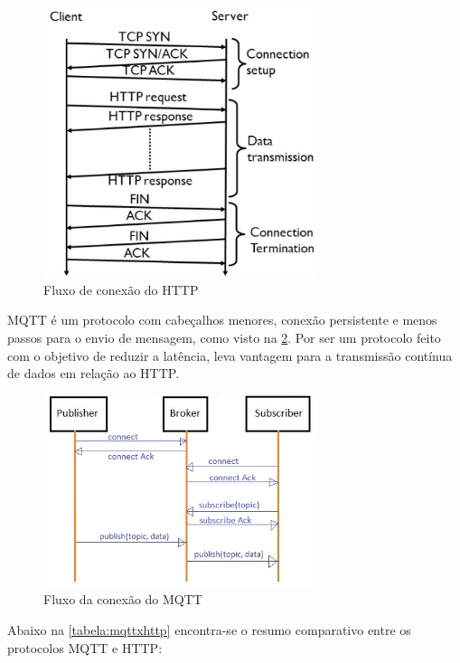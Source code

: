 \begin{figure}[h]
\centering
\includegraphics[width=8cm]{./02_Capitulos/02_Cap3/figures/http-flow}
\caption{Fluxo de conexão do HTTP}
\label{fig:3.2.0/http-flow}
\end{figure}

MQTT é um protocolo com cabeçalhos menores, conexão persistente e menos passos para o envio de mensagem, como visto na \ref{fig:3.2.0/mqtt-flow}. Por ser um protocolo feito com o objetivo de reduzir a latência, leva vantagem para a transmissão contínua de dados  em relação ao HTTP.

\begin{figure}[h]
\centering
\includegraphics[width=8cm]{./02_Capitulos/02_Cap3/figures/mqtt-flow}
\caption{Fluxo da conexão do MQTT}
\label{fig:3.2.0/mqtt-flow}
\end{figure}

Abaixo na \ref{tabela:mqttxhttp} encontra-se o resumo comparativo entre os protocolos MQTT e HTTP:

